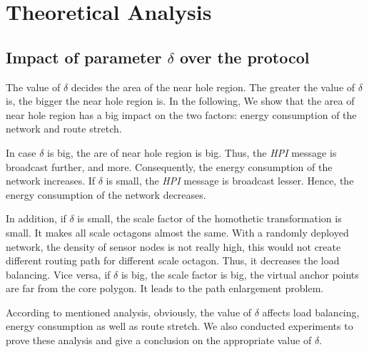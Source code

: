 \section{Theoretical Analysis}
\subsection{Impact of parameter $\delta$ over the protocol}
The value of $\delta$ decides the area of the near hole region. The greater the value of $\delta$ is, the bigger the near hole region is. In the following, We show that the area of near hole region has a big impact on the two factors: energy consumption of the network and route stretch.

In case $\delta$ is big, the are of near hole region is big. Thus, the \emph{HPI} message is broadcast further, and more. Consequently, the energy consumption of the network increases. If $\delta$ is small, the \emph{HPI} message is broadcast lesser. Hence, the energy consumption of the network decreases.

In addition, if $\delta$ is small, the scale factor of the homothetic transformation is small. It makes all scale octagons almost the same. With a randomly deployed network, the density of sensor nodes is not really high, this would not create different routing path for different scale octagon. Thus, it decreases the load balancing. Vice versa, if $\delta$ is big, the scale factor is big, the virtual anchor points are far from the core polygon. It leads to the path enlargement problem.

According to mentioned analysis, obviously, the value of $\delta$ affects load balancing, energy consumption as well as route stretch. We also conducted experiments to prove these analysis and give a conclusion on the appropriate value of $\delta$.
